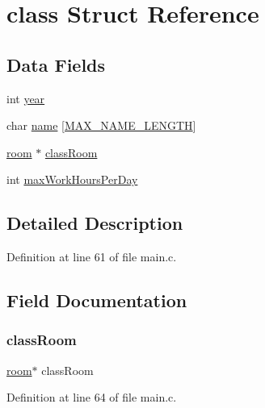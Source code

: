 \hypertarget{structclass}{}\section{class Struct Reference}
\label{structclass}
\subsection*{Data Fields}
\begin{DoxyCompactItemize}
\item 
int \hyperlink{structclass_abeac221e38b7b9ce7df8722c842bf671}{year}
\item 
char \hyperlink{structclass_ad50982abf9e9bbbc784f8f17fa25b1b2}{name} \mbox{[}\hyperlink{main_8c_a0c397a708cec89c74029582574516b30}{M\+A\+X\+\_\+\+N\+A\+M\+E\+\_\+\+L\+E\+N\+G\+TH}\mbox{]}
\item 
\hyperlink{structroom}{room} $\ast$ \hyperlink{structclass_a52c2ba4ef4837566d565a81cdf3fd530}{class\+Room}
\item 
int \hyperlink{structclass_a1ffb8e5412af16a5be765756fe880507}{max\+Work\+Hours\+Per\+Day}
\end{DoxyCompactItemize}


\subsection{Detailed Description}


Definition at line 61 of file main.\+c.



\subsection{Field Documentation}
\hypertarget{structclass_a52c2ba4ef4837566d565a81cdf3fd530}{}\label{structclass_a52c2ba4ef4837566d565a81cdf3fd530} 
\subsubsection{\texorpdfstring{class\+Room}{classRoom}}
{\footnotesize\ttfamily \hyperlink{structroom}{room}$\ast$ class\+Room}



Definition at line 64 of file main.\+c.

\hypertarget{structclass_a1ffb8e5412af16a5be765756fe880507}{}\label{structclass_a1ffb8e5412af16a5be765756fe880507} 

